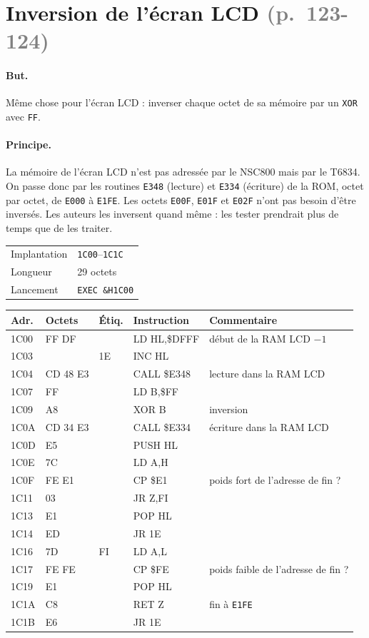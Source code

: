\documentclass[a4paper,10pt]{article}
\makeatletter
\newcommand{\hex}[1]{\texttt{#1}}
\newcommand{\pg}[1]{\texorpdfstring{\textcolor{gray}{\small(p.~#1)}}{}}
\newcommand{\fiche}[3]{%
  \begin{center}\small
  \begin{tabular}{@{}ll@{}}
  \toprule
  Implantation & #1 \\
  Longueur & #2 \\
  Lancement & #3 \\
  \bottomrule
  \end{tabular}
  \end{center}}
\newenvironment{asm}
  {\small\begin{longtable}{@{}>{\ttfamily}l>{\ttfamily}l>{\ttfamily}l>{\ttfamily}l>{\raggedright\arraybackslash}p{6.2cm}@{}}
   \toprule
   \normalfont\bfseries Adr. & \normalfont\bfseries Octets & \normalfont\bfseries Étiq. & \normalfont\bfseries Instruction & \textbf{Commentaire}\\
   \midrule\endhead
   \bottomrule\endfoot}
  {\end{longtable}}
\makeatother
\begin{document}
\section{Inversion de l'écran LCD \pg{123-124}}

\paragraph{But.} Même chose pour l'écran LCD : inverser chaque octet de sa
mémoire par un \texttt{XOR} avec \hex{FF}.

\paragraph{Principe.} La mémoire de l'écran LCD n'est pas adressée par le
NSC800 mais par le T6834. On passe donc par les routines \hex{E348}
(lecture) et \hex{E334} (écriture) de la ROM, octet par octet, de
\hex{E000} à \hex{E1FE}. Les octets \hex{E00F}, \hex{E01F} et \hex{E02F}
n'ont pas besoin d'être inversés. Les auteurs les inversent quand même :
les tester prendrait plus de temps que de les traiter.

\fiche{\hex{1C00}--\hex{1C1C}}{29 octets}{\texttt{EXEC \&H1C00}}

\begin{asm}
1C00 & 21 FF DF &    & LD HL,\$DFFF   & début de la RAM LCD $-1$ \\
1C03 & 23       & 1E & INC HL         & \\
1C04 & CD 48 E3 &    & CALL \$E348    & lecture dans la RAM LCD \\
1C07 & 06 FF    &    & LD B,\$FF      & \\
1C09 & A8       &    & XOR B          & inversion \\
1C0A & CD 34 E3 &    & CALL \$E334    & écriture dans la RAM LCD \\
1C0D & E5       &    & PUSH HL        & \\
1C0E & 7C       &    & LD A,H         & \\
1C0F & FE E1    &    & CP \$E1        & poids fort de l'adresse de fin ? \\
1C11 & 28 03    &    & JR Z,FI        & \\
1C13 & E1       &    & POP HL         & \\
1C14 & 18 ED    &    & JR 1E          & \\
1C16 & 7D       & FI & LD A,L         & \\
1C17 & FE FE    &    & CP \$FE        & poids faible de l'adresse de fin ? \\
1C19 & E1       &    & POP HL         & \\
1C1A & C8       &    & RET Z          & fin à \hex{E1FE} \\
1C1B & 18 E6    &    & JR 1E          & \\
\end{asm}
\end{document}

